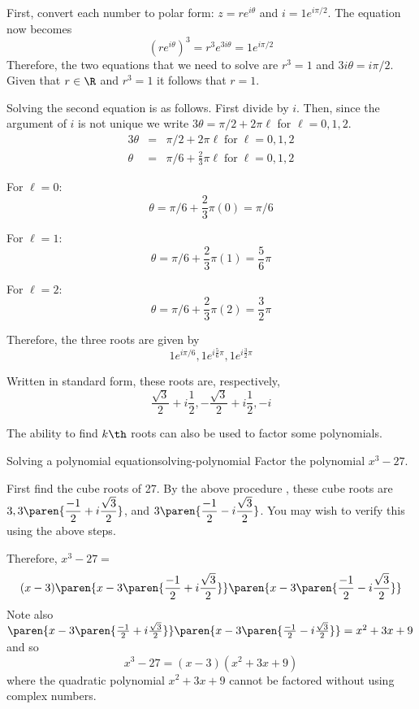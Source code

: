 \begin{solution}
First, convert each number to polar form: $z = re^{i\theta}$ and $i = 1 e^{i \pi/2}$. The equation now becomes
\[
(re^{i\theta})^3 = r^3 e^{3i\theta} = 1 e^{i \pi/2}
\]
Therefore, the two equations that we need to solve are $r^3 = 1$ and $3i\theta = i \pi/2$. Given that $r \in \R$ and $r^3 = 1$ it follows that $r=1$. 

Solving the second equation is as follows. First divide by $i$. Then, since the argument of $i$ is not unique we write $3\theta = \pi/2 + 2\pi\ell$ for $\ell = 0,1,2$. 
\begin{eqnarray*}
3\theta &=& \pi/2 + 2\pi\ell \; \mbox{for} \; \ell = 0,1,2 \\
\theta &=& \pi/6 + \frac{2}{3} \pi\ell \; \mbox{for} \; \ell = 0,1,2 
\end{eqnarray*}

For $\ell = 0$:
\[
\theta = \pi/6 + \frac{2}{3} \pi (0) = \pi/6
\]

For $\ell = 1$:
\[
\theta = \pi/6 + \frac{2}{3} \pi(1) = \frac{5}{6} \pi
\]

For $\ell = 2$:
\[
\theta = \pi/6 + \frac{2}{3} \pi(2) = \frac{3}{2} \pi
\]

Therefore, the three roots are given by \[
1e^{i \pi/6}, 1e^{i \frac{5}{6}\pi}, 1e^{i \frac{3}{2}\pi}
\]

Written in standard form, these roots are, respectively,
\[
\frac{\sqrt{3}}{2} + i \frac{1}{2}, -\frac{\sqrt{3}}{2} + i \frac{1}{2}, -i
\]

\end{solution}

The ability to find $k\th$ roots can also be used to factor some
polynomials.

\begin{example}{Solving a polynomial equation}{solving-polynomial}
Factor the polynomial $x^{3}-27$.
\end{example}

\begin{solution}
First find the cube roots of 27. By the above procedure
, these cube roots
are $3,3\paren{\displaystyle
\frac{-1}{2}+i\displaystyle\frac{\sqrt{3}}{2}}$, and $3\paren{
\displaystyle\frac{-1}{2}-i\displaystyle\frac{\sqrt{3}}{2}}$. You may wish to verify 
this using the above steps.

Therefore, $x^{3}-27 =$
\begin{equation*}
 (x-3) \paren{x-3\paren{\frac{-1}{2}+i\frac{\sqrt{3}}{2}}
} \paren{x-3\paren{\frac{-1}{2}-i\frac{\sqrt{3}}{2}}} 
\end{equation*}
Note also $\paren{x-3\paren{\frac{-1}{2}+i\frac{\sqrt{3}}{2}}}
\paren{x-3\paren{\frac{-1}{2}-i\frac{\sqrt{3}}{2}}}
=\allowbreak x^{2}+3x+9$ and so
\begin{equation*}
x^{3}-27=(x-3) (x^{2}+3x+9)
\end{equation*}
where the quadratic polynomial $x^{2}+3x+9$ cannot be factored without using
complex numbers.
\end{solution}

